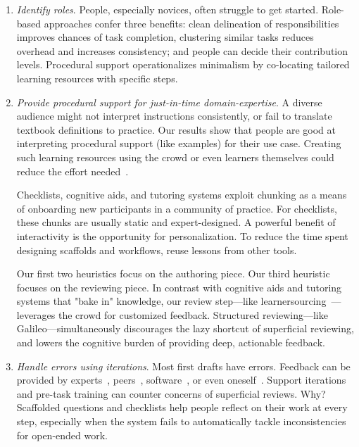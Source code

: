 \begin{enumerate}
\item \textit{Identify roles}. People, especially novices, often struggle to get started. Role-based approaches confer three benefits: clean delineation of responsibilities improves chances of task completion, clustering similar tasks reduces overhead and increases consistency; and people can decide their contribution levels. Procedural support operationalizes minimalism by co-locating tailored learning resources with specific steps.

\item \textit{Provide procedural support for just-in-time domain-expertise}. A diverse audience might not interpret instructions consistently, or fail to translate textbook definitions to practice. Our results show that people are good at interpreting procedural support (like examples) for their use case. Creating such learning resources using the crowd or even learners themselves could reduce the effort needed~\cite{Kim2014c}. 

Checklists, cognitive aids, and tutoring systems exploit chunking as a means of onboarding new participants in a community of practice. For checklists, these chunks are usually static and expert-designed. A powerful benefit of interactivity is the opportunity for personalization. To reduce the time spent designing scaffolds and workflows, reuse lessons from other tools.
 
Our first two heuristics focus on the authoring piece. Our third heuristic focuses on the reviewing piece. In contrast with cognitive aids and tutoring systems that "bake in" knowledge, our review step---like learnersourcing~\cite{Kim2014c}---leverages the crowd for customized feedback. Structured reviewing---like Galileo---simultaneously discourages the lazy shortcut of superficial reviewing, and lowers the cognitive burden of providing deep, actionable feedback. 

\item \textit{Handle errors using iterations}. Most first drafts have errors. Feedback can be provided by experts~\cite{dow2012shepherding, schon1984reflective}, peers~\cite{Boud1995, Kulkarni2015b}, software~\cite{Dantoni2015}, or even oneself~\cite{Boud1995, schon1984reflective}. Support iterations and pre-task training can counter concerns of superficial reviews. Why? Scaffolded questions and checklists help people reflect on their work at every step, especially when the system fails to automatically tackle inconsistencies for open-ended work.
\end{enumerate}

